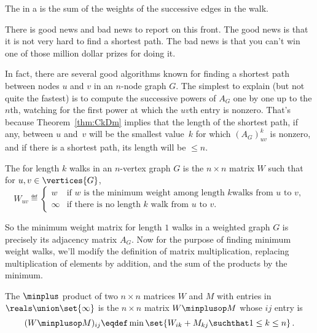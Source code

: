 \iffalse
\begin{definition}\label{def:5H}
  The   in a  is the sum of the weights of
  the successive edges in the walk.
\end{definition}

\begin{editingnotes}
There is good news and bad news to report on this front.  The good
news is that it is not very hard to find a shortest path.  The bad
news is that you can't win one of those million dollar prizes for
doing it.

In fact, there are several good algorithms known for finding a shortest
path between nodes $u$ and $v$ in an $n$-node graph $G$.  The simplest to
explain (but not quite the fastest) is to compute  the successive powers of $A_G$ one by one up
to the $n$th, watching for the first power at which the $uv$th entry is
nonzero.  That's because Theorem~\ref{thm:CkDm} implies that the length of
the shortest path, if any, between $u$ and~$v$ will be the smallest
value~$k$ for which $(A_G)_{uv}^k$ is nonzero, and if there is a shortest
path, its length will be $\leq n$.
\end{editingnotes}


\begin{definition}
  The  for length $k$ walks in an $n$-vertex
  graph $G$ is the $n \times n$ matrix $W$ such that for $u,v \in \vertices{G}$,
\begin{equation}\label{def:weight_matrix}
W_{uv} \eqdef
\begin{cases} w & \text{if $w$ is the minimum weight among length $k$
                            walks from $u$ to $v$},\\
              \infty & \text{if there is no length $k$ walk from $u$ to $v$}.
\end{cases}
\end{equation}
\end{definition}

So the minimum weight matrix for length $1$ walks in a weighted graph $G$
is precisely its adjacency matrix $A_G$.  Now for the purpose of finding
minimum weight walks, we'll modify the definition of matrix
multiplication, replacing multiplication of elements by addition, and the
sum of the products by the minimum.

\begin{definition}\label{def:minplus}
  The $\minplus$ product of two $n\times n$ matrices $W$ and $M$ with
  entries in $\reals\union \set{\infty}$ is the $n \times n$ matrix
  $W\minplusop M$ whose $ij$ entry is
\[
(W\minplusop M )_{ij} \eqdef \min \set{W_{ik} + M_{kj} \suchthat 1 \leq k \leq n}\, .
\]
\end{definition}

